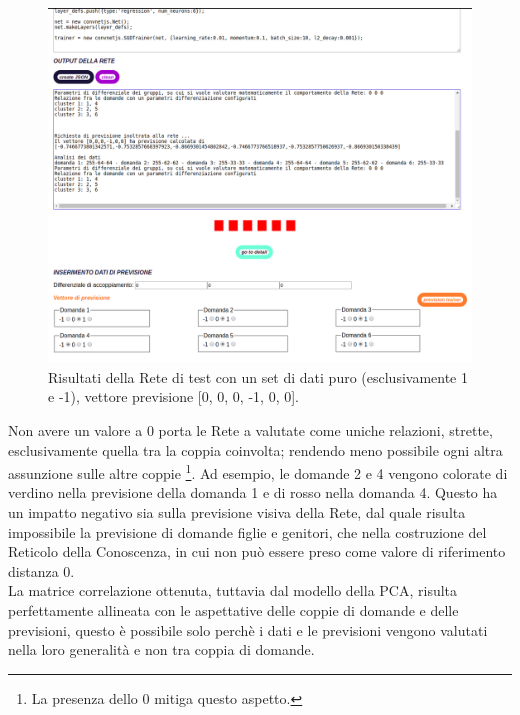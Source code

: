 \begin{figure}[H]
\centering
	\includegraphics[width=1\linewidth]{./image/RetediProva_generatorinputpuro3.png}
	\caption{Risultati della Rete di test con un set di dati puro (esclusivamente 1 e -1), vettore previsione [0, 0, 0, -1, 0, 0].}
	\label{Risultati della Rete di test con un set di dati puro (esclusivamente 1 e -1), vettore previsione [0, 0, 0, -1, 0, 0].}
\end{figure}
\noindent
Non avere un valore a 0 porta le Rete a valutate come uniche relazioni, strette, esclusivamente quella tra la coppia coinvolta; rendendo meno possibile ogni altra assunzione sulle altre coppie \footnote{La presenza dello 0 mitiga questo aspetto.}. Ad esempio, le domande 2 e 4 vengono colorate di verdino nella previsione della domanda 1 e di rosso nella domanda 4. Questo ha un impatto negativo sia sulla previsione visiva della Rete, dal quale risulta impossibile la previsione di domande figlie e genitori, che nella costruzione del Reticolo della Conoscenza, in cui non può essere preso come valore di riferimento distanza 0.\\
La matrice correlazione ottenuta, tuttavia dal modello della PCA, risulta perfettamente allineata con le aspettative delle coppie di domande e delle previsioni, questo \`e possibile solo perch\`e i dati e le previsioni vengono valutati nella loro generalit\`a e non tra coppia di domande.


